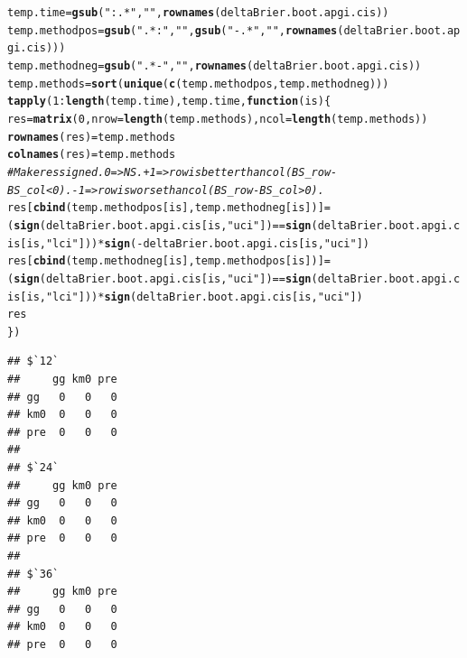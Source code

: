 \documentclass{article}\usepackage[]{graphicx}\usepackage[]{color}
\makeatletter
\newcommand{\hlnum}[1]{\textcolor[rgb]{0.686,0.059,0.569}{#1}}%
\newcommand{\hlstr}[1]{\textcolor[rgb]{0.192,0.494,0.8}{#1}}%
\newcommand{\hlcom}[1]{\textcolor[rgb]{0.678,0.584,0.686}{\textit{#1}}}%
\newcommand{\hlopt}[1]{\textcolor[rgb]{0,0,0}{#1}}%
\newcommand{\hlstd}[1]{\textcolor[rgb]{0.345,0.345,0.345}{#1}}%
\newcommand{\hlkwa}[1]{\textcolor[rgb]{0.161,0.373,0.58}{\textbf{#1}}}%
\newcommand{\hlkwb}[1]{\textcolor[rgb]{0.69,0.353,0.396}{#1}}%
\newcommand{\hlkwc}[1]{\textcolor[rgb]{0.333,0.667,0.333}{#1}}%
\newcommand{\hlkwd}[1]{\textcolor[rgb]{0.737,0.353,0.396}{\textbf{#1}}}%
\newenvironment{kframe}{%
 \def\at@end@of@kframe{}%
 \ifinner\ifhmode%
  \def\at@end@of@kframe{\end{minipage}}%
  \begin{minipage}{\columnwidth}%
 \fi\fi%
 \def\FrameCommand##1{\hskip\@totalleftmargin \hskip-\fboxsep
 \colorbox{shadecolor}{##1}\hskip-\fboxsep
     \hskip-\linewidth \hskip-\@totalleftmargin \hskip\columnwidth}%
 \MakeFramed {\advance\hsize-\width
   \@totalleftmargin\z@ \linewidth\hsize
   \@setminipage}}%
 {\par\unskip\endMakeFramed%
 \at@end@of@kframe}
\newenvironment{knitrout}{}{} %
\makeatother
\begin{document}
\begin{knitrout}
\color{fgcolor}\begin{kframe}
\begin{alltt}
\hlstd{temp.time} \hlkwb{=} \hlkwd{gsub}\hlstd{(}\hlstr{":.*"}\hlstd{,} \hlstr{""}\hlstd{,} \hlkwd{rownames}\hlstd{(deltaBrier.boot.apgi.cis))}
\hlstd{temp.methodpos} \hlkwb{=} \hlkwd{gsub}\hlstd{(}\hlstr{".*:"}\hlstd{,} \hlstr{""}\hlstd{,} \hlkwd{gsub}\hlstd{(}\hlstr{"-.*"}\hlstd{,} \hlstr{""}\hlstd{,} \hlkwd{rownames}\hlstd{(deltaBrier.boot.apgi.cis)))}
\hlstd{temp.methodneg} \hlkwb{=} \hlkwd{gsub}\hlstd{(}\hlstr{".*-"}\hlstd{,} \hlstr{""}\hlstd{,} \hlkwd{rownames}\hlstd{(deltaBrier.boot.apgi.cis))}
\hlstd{temp.methods} \hlkwb{=} \hlkwd{sort}\hlstd{(}\hlkwd{unique}\hlstd{(}\hlkwd{c}\hlstd{(temp.methodpos, temp.methodneg)))}
\hlkwd{tapply}\hlstd{(}\hlnum{1}\hlopt{:}\hlkwd{length}\hlstd{(temp.time), temp.time,} \hlkwa{function}\hlstd{(}\hlkwc{is}\hlstd{) \{}
        \hlstd{res} \hlkwb{=} \hlkwd{matrix}\hlstd{(}\hlnum{0}\hlstd{,} \hlkwc{nrow} \hlstd{=} \hlkwd{length}\hlstd{(temp.methods),} \hlkwc{ncol} \hlstd{=} \hlkwd{length}\hlstd{(temp.methods))}
        \hlkwd{rownames}\hlstd{(res)} \hlkwb{=} \hlstd{temp.methods}
        \hlkwd{colnames}\hlstd{(res)} \hlkwb{=} \hlstd{temp.methods}
        \hlcom{# Make res signed.  0 => NS.  +1 => row is better than col (BS_row - BS_col < 0).  -1 => row is worse than col (BS_row - BS_col > 0).}
        \hlstd{res[}\hlkwd{cbind}\hlstd{(temp.methodpos[is], temp.methodneg[is])]} \hlkwb{=} \hlstd{(}\hlkwd{sign}\hlstd{(deltaBrier.boot.apgi.cis[is,} \hlstr{"uci"}\hlstd{])} \hlopt{==} \hlkwd{sign}\hlstd{(deltaBrier.boot.apgi.cis[is,} \hlstr{"lci"}\hlstd{]))} \hlopt{*} \hlkwd{sign}\hlstd{(}\hlopt{-}\hlstd{deltaBrier.boot.apgi.cis[is,} \hlstr{"uci"}\hlstd{])}
        \hlstd{res[}\hlkwd{cbind}\hlstd{(temp.methodneg[is], temp.methodpos[is])]} \hlkwb{=} \hlstd{(}\hlkwd{sign}\hlstd{(deltaBrier.boot.apgi.cis[is,} \hlstr{"uci"}\hlstd{])} \hlopt{==} \hlkwd{sign}\hlstd{(deltaBrier.boot.apgi.cis[is,} \hlstr{"lci"}\hlstd{]))} \hlopt{*} \hlkwd{sign}\hlstd{(deltaBrier.boot.apgi.cis[is,} \hlstr{"uci"}\hlstd{])}
        \hlstd{res}
\hlstd{\})}
\end{alltt}
\begin{verbatim}
## $`12`
##     gg km0 pre
## gg   0   0   0
## km0  0   0   0
## pre  0   0   0
## 
## $`24`
##     gg km0 pre
## gg   0   0   0
## km0  0   0   0
## pre  0   0   0
## 
## $`36`
##     gg km0 pre
## gg   0   0   0
## km0  0   0   0
## pre  0   0   0
\end{verbatim}
\end{kframe}
\end{knitrout}
\end{document}
